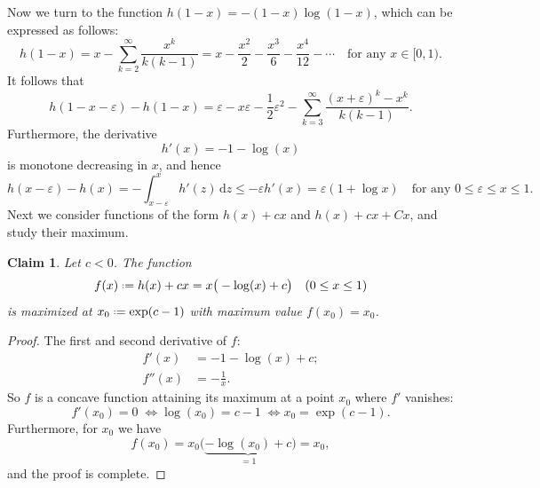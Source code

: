 \documentclass[12pt]{amsart}
\newtheorem{claim}[theorem]{Claim}
\theoremstyle{definition}
\newcommand\eps{\varepsilon}
\newcommand{\defeq}{\mathrel{\vcenter{\baselineskip0.5ex \lineskiplimit0pt
                     \hbox{\scriptsize.}\hbox{\scriptsize.}}}%
                     =}
\begin{document}
Now we turn to the function $h(1-x)=-(1-x)\log(1-x)$, which can be expressed as follows:
%
\begin{equation} \label{eq:h_ps}
h(1-x) = x - \sum_{k=2}^\infty \frac{x^k}{k(k-1)} 
= x - \frac{x^2}{2} - \frac{x^3}{6} - \frac{x^4}{12} - \cdots \quad \text{for any } x \in [0,1) .
\end{equation}
%
It follows that 
%
\begin{equation} \label{eq:h_diff2_simple}
h(1-x-\eps) - h(1-x) 
= \eps - x\eps -\frac12 \eps^2
- \sum_{k=3}^\infty \frac{(x+\eps)^k-x^k}{k(k-1)} .
\end{equation}
%
Furthermore, the derivative 
%
\[ h'(x) = -1 - \log(x) \]
%
is monotone decreasing in $x$, and hence 
% 
\begin{equation} \label{eq:h_diff1}
h(x-\eps) - h(x) 
= - \int_{x-\eps}^x h'(z) \,\mathrm{d}z 
\leq -\eps h'(x) = \eps(1+\log x) 
\quad \text{for any } 0 \leq \eps \leq x \leq 1.
\end{equation}
%
Next we consider functions of the form $h(x)+cx$ and $h(x)+cx+Cx$, and study their maximum.
%
\begin{claim} \label{cl:hx+cx}
Let $c<0$. The function 
%
\[ f(x) \defeq h(x)+cx = x \big( -\log(x) + c \big) 
\quad (0 \leq x \leq 1) \]
%
is maximized at $x_0 \defeq \exp(c-1)$ with maximum value $f(x_0)=x_0$. 
\end{claim}
%
\begin{proof}
The first and second derivative of $f$:
%
\begin{align*}
f'(x) &= -1 -\log(x) + c ;\\
f''(x) &= -\frac{1}{x} .
\end{align*} 
%
So $f$ is a concave function attaining its maximum at a point $x_0$ where $f'$ vanishes:  
%
\[ f'(x_0) = 0 \; \Leftrightarrow 
\log(x_0)=c-1 \; \Leftrightarrow 
x_0= \exp(c-1) .\]
%
Furthermore, for $x_0$ we have 
%
\[ f(x_0)= x_0 \big( \underbrace{-\log(x_0) + c}_{=1} \big) 
= x_0 ,\]
%
and the proof is complete.
\end{proof}
%
\end{document}
